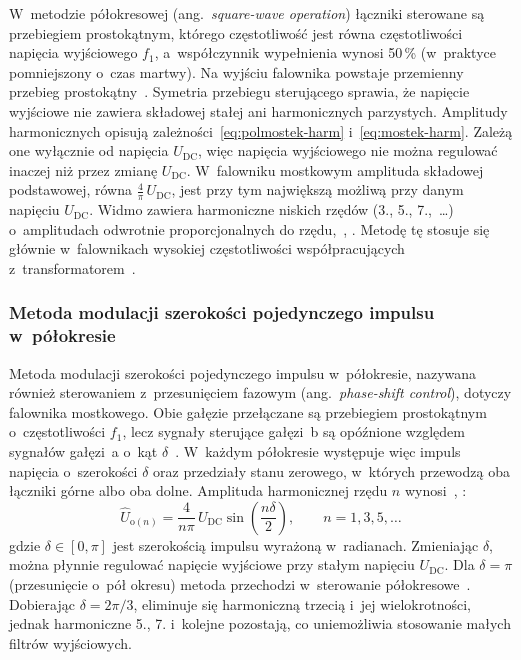 W~metodzie półokresowej (ang.~\textit{square-wave operation}) łączniki
sterowane są przebiegiem prostokątnym, którego częstotliwość jest równa
częstotliwości napięcia wyjściowego $f_1$, a~współczynnik wypełnienia wynosi
50\,\% (w~praktyce pomniejszony o~czas martwy). Na wyjściu falownika powstaje
przemienny przebieg prostokątny~\cite[s.~6]{instrukcja}. Symetria przebiegu
sterującego sprawia, że napięcie wyjściowe nie zawiera składowej stałej ani
harmonicznych parzystych. Amplitudy
harmonicznych opisują zależności~\eqref{eq:polmostek-harm}
i~\eqref{eq:mostek-harm}. Zależą one wyłącznie od napięcia $U_\mathrm{DC}$,
więc napięcia wyjściowego nie można regulować inaczej niż przez zmianę
$U_\mathrm{DC}$. W~falowniku mostkowym amplituda składowej podstawowej,
równa $\frac{4}{\pi}\,U_\mathrm{DC}$, jest przy tym największą możliwą przy
danym napięciu $U_\mathrm{DC}$. Widmo zawiera harmoniczne niskich rzędów
(3., 5., 7.,~\ldots) o~amplitudach odwrotnie proporcjonalnych do rzędu,~\cite[s.~6--8]{instrukcja},
\cite[podrozdz.~8-2-2]{mohan2003}. Metodę tę stosuje się głównie
w~falownikach wysokiej częstotliwości współpracujących z~transformatorem~\cite[s.~15--17]{instrukcja}.

\subsubsection*{Metoda modulacji szerokości pojedynczego impulsu w~półokresie}

Metoda modulacji szerokości pojedynczego impulsu w~półokresie, nazywana
również sterowaniem z~przesunięciem fazowym (ang.~\textit{phase-shift
control}), dotyczy falownika mostkowego. Obie gałęzie przełączane są
przebiegiem prostokątnym o~częstotliwości $f_1$, lecz sygnały sterujące
gałęzi~b są opóźnione względem sygnałów gałęzi~a o~kąt
$\delta$~\cite[s.~8]{instrukcja}. W~każdym półokresie występuje więc impuls
napięcia o~szerokości $\delta$ oraz przedziały stanu zerowego, w~których
przewodzą oba łączniki górne albo oba dolne. Amplituda harmonicznej rzędu $n$
wynosi~\cite[s.~8--9]{instrukcja}, \cite[podrozdz.~8-3-2-4, wzór (8-37)]{mohan2003}:
\begin{equation}
  \hat{U}_{\mathrm{o}(n)} = \frac{4}{n\pi}\, U_\mathrm{DC}
  \sin\!\left(\frac{n\delta}{2}\right), \qquad n = 1, 3, 5, \ldots
  \label{eq:pojedynczy-impuls}
\end{equation}
gdzie $\delta \in [0, \pi]$ jest szerokością impulsu wyrażoną w~radianach.
Zmieniając $\delta$, można płynnie regulować napięcie wyjściowe przy stałym
napięciu $U_\mathrm{DC}$. Dla $\delta = \pi$ (przesunięcie o~pół okresu)
metoda przechodzi w~sterowanie półokresowe~\cite[s.~9, 18]{instrukcja}.
Dobierając $\delta = 2\pi/3$, eliminuje się harmoniczną trzecią i~jej
wielokrotności, jednak harmoniczne 5., 7. i~kolejne pozostają, co
uniemożliwia stosowanie małych filtrów wyjściowych.

